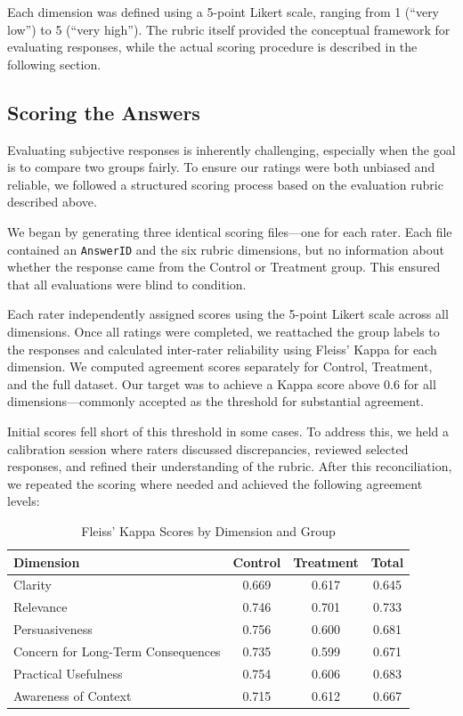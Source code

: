\documentclass[sigconf, authorversion, nonacm, screen]{acmart}
\begin{document}
Each dimension was defined using a 5-point Likert scale, ranging from 1 (``very low'') to 5 (``very high''). The rubric itself provided the conceptual framework for evaluating responses, while the actual scoring procedure is described in the following section.


\subsection{Scoring the Answers}
Evaluating subjective responses is inherently challenging, especially when the goal is to compare two groups fairly. To ensure our ratings were both unbiased and reliable, we followed a structured scoring process based on the evaluation rubric described above.

We began by generating three identical scoring files---one for each rater. Each file contained an \texttt{AnswerID} and the six rubric dimensions, but no information about whether the response came from the Control or Treatment group. This ensured that all evaluations were blind to condition.

Each rater independently assigned scores using the 5-point Likert scale across all dimensions. Once all ratings were completed, we reattached the group labels to the responses and calculated inter-rater reliability using Fleiss' Kappa for each dimension. We computed agreement scores separately for Control, Treatment, and the full dataset. Our target was to achieve a Kappa score above 0.6 for all dimensions---commonly accepted as the threshold for substantial agreement.

Initial scores fell short of this threshold in some cases. To address this, we held a calibration session where raters discussed discrepancies, reviewed selected responses, and refined their understanding of the rubric. After this reconciliation, we repeated the scoring where needed and achieved the following agreement levels:

\begin{table}[H]
\centering
\caption{Fleiss' Kappa Scores by Dimension and Group}
\begin{tabular}{lccc}
\toprule
\textbf{Dimension} & \textbf{Control} & \textbf{Treatment} & \textbf{Total} \\
\midrule
Clarity & 0.669 & 0.617 & 0.645 \\
Relevance & 0.746 & 0.701 & 0.733 \\
Persuasiveness & 0.756 & 0.600 & 0.681 \\
Concern for Long-Term Consequences & 0.735 & 0.599 & 0.671 \\
Practical Usefulness & 0.754 & 0.606 & 0.683 \\
Awareness of Context & 0.715 & 0.612 & 0.667 \\
\bottomrule
\end{tabular}
\label{tab:kappa}
\end{table}
\end{document}
